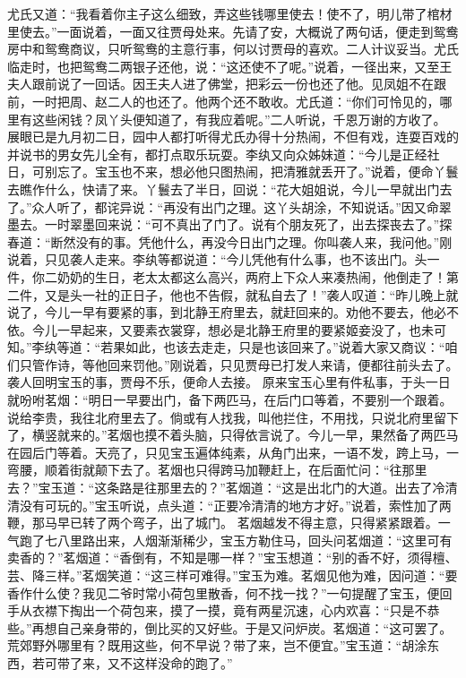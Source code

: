 \documentclass[12pt,oneside]{book}
\begin{document}
尤氏又道：“我看着你主子这么细致，弄这些钱哪里使去！使不了，明儿带了棺材里使去。”一面说着，一面又往贾母处来。先请了安，大概说了两句话，便走到鸳鸯房中和鸳鸯商议，只听鸳鸯的主意行事，何以讨贾母的喜欢。二人计议妥当。尤氏临走时，也把鸳鸯二两银子还他，说：“这还使不了呢。”说着，一径出来，又至王夫人跟前说了一回话。因王夫人进了佛堂，把彩云一份也还了他。见凤姐不在跟前，一时把周、赵二人的也还了。他两个还不敢收。尤氏道：“你们可怜见的，哪里有这些闲钱？凤丫头便知道了，有我应着呢。”二人听说，千恩万谢的方收了。
展眼已是九月初二日，园中人都打听得尤氏办得十分热闹，不但有戏，连耍百戏的并说书的男女先儿全有，都打点取乐玩耍。李纨又向众姊妹道：“今儿是正经社日，可别忘了。宝玉也不来，想必他只图热闹，把清雅就丢开了。”说着，便命丫鬟去瞧作什么，快请了来。丫鬟去了半日，回说：“花大姐姐说，今儿一早就出门去了。”众人听了，都诧异说：“再没有出门之理。这丫头胡涂，不知说话。”因又命翠墨去。一时翠墨回来说：“可不真出了门了。说有个朋友死了，出去探丧去了。”探春道：“断然没有的事。凭他什么，再没今日出门之理。你叫袭人来，我问他。”刚说着，只见袭人走来。李纨等都说道：“今儿凭他有什么事，也不该出门。头一件，你二奶奶的生日，老太太都这么高兴，两府上下众人来凑热闹，他倒走了！第二件，又是头一社的正日子，他也不告假，就私自去了！”袭人叹道：“昨儿晚上就说了，今儿一早有要紧的事，到北静王府里去，就赶回来的。劝他不要去，他必不依。今儿一早起来，又要素衣裳穿，想必是北静王府里的要紧姬妾没了，也未可知。”李纨等道：“若果如此，也该去走走，只是也该回来了。”说着大家又商议：“咱们只管作诗，等他回来罚他。”刚说着，只见贾母已打发人来请，便都往前头去了。袭人回明宝玉的事，贾母不乐，便命人去接。
原来宝玉心里有件私事，于头一日就吩咐茗烟：“明日一早要出门，备下两匹马，在后门口等着，不要别一个跟着。说给李贵，我往北府里去了。倘或有人找我，叫他拦住，不用找，只说北府里留下了，横竖就来的。”茗烟也摸不着头脑，只得依言说了。今儿一早，果然备了两匹马在园后门等着。天亮了，只见宝玉遍体纯素，从角门出来，一语不发，跨上马，一弯腰，顺着街就颠下去了。茗烟也只得跨马加鞭赶上，在后面忙问：“往那里去？”宝玉道：“这条路是往那里去的？”茗烟道：“这是出北门的大道。出去了冷清清没有可玩的。”宝玉听说，点头道：“正要冷清清的地方才好。”说着，索性加了两鞭，那马早已转了两个弯子，出了城门。
茗烟越发不得主意，只得紧紧跟着。一气跑了七八里路出来，人烟渐渐稀少，宝玉方勒住马，回头问茗烟道：“这里可有卖香的？”茗烟道：“香倒有，不知是哪一样？”宝玉想道：“别的香不好，须得檀、芸、降三样。”茗烟笑道：“这三样可难得。”宝玉为难。茗烟见他为难，因问道：“要香作什么使？我见二爷时常小荷包里散香，何不找一找？”一句提醒了宝玉，便回手从衣襟下掏出一个荷包来，摸了一摸，竟有两星沉速，心内欢喜：“只是不恭些。”再想自己亲身带的，倒比买的又好些。于是又问炉炭。茗烟道：“这可罢了。荒郊野外哪里有？既用这些，何不早说？带了来，岂不便宜。”宝玉道：“胡涂东西，若可带了来，又不这样没命的跑了。”
\end{document}
